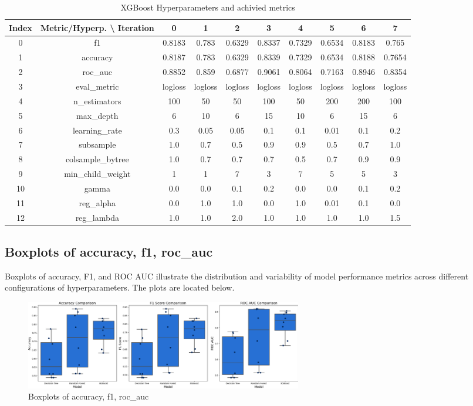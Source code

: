 \documentclass{article}%
\begin{document}
\begin{table}[h!]%
\caption{XGBoost Hyperparameters and achivied metrics}%
\vspace{0.2cm}%
\centering%
\begin{tabular}{|c||c||c||c||c||c||c||c||c||c|}%
\hline%
Index&Metric/Hyperp. \textbackslash{} Iteration&0&1&2&3&4&5&6&7\\%
\hline%
0&f1&0.8183&0.783&0.6329&0.8337&0.7329&0.6534&0.8183&0.765\\%
1&accuracy&0.8187&0.783&0.6329&0.8339&0.7329&0.6534&0.8188&0.7654\\%
2&roc\_auc&0.8852&0.859&0.6877&0.9061&0.8064&0.7163&0.8946&0.8354\\%
3&eval\_metric&logloss&logloss&logloss&logloss&logloss&logloss&logloss&logloss\\%
4&n\_estimators&100&50&50&100&50&200&200&100\\%
5&max\_depth&6&10&6&15&10&6&15&6\\%
6&learning\_rate&0.3&0.05&0.05&0.1&0.1&0.01&0.1&0.2\\%
7&subsample&1.0&0.7&0.5&0.9&0.9&0.5&0.7&1.0\\%
8&colsample\_bytree&1.0&0.7&0.7&0.7&0.5&0.7&0.9&0.9\\%
9&min\_child\_weight&1&1&7&3&7&5&5&3\\%
10&gamma&0.0&0.0&0.1&0.2&0.0&0.0&0.1&0.2\\%
11&reg\_alpha&0.0&1.0&1.0&0.0&1.0&0.01&0.1&0.0\\%
12&reg\_lambda&1.0&1.0&2.0&1.0&1.0&1.0&1.0&1.5\\%
\hline%
\end{tabular}%
\end{table}

%
\newpage%
\subsection{Boxplots of accuracy, f1, roc\_auc}%
\label{subsec:Boxplotsofaccuracy,f1,rocauc}%
Boxplots of accuracy, F1, and ROC AUC illustrate the distribution and variability of model performance metrics across different configurations of hyperparameters. The plots are located below.%


\begin{figure}[h!]%
\centering%
\includegraphics[width=460px]{ModelOptimization/box_plots_metrics.png}%
\caption{Boxplots of accuracy, f1, roc\_auc}%
\end{figure}
\end{document}

